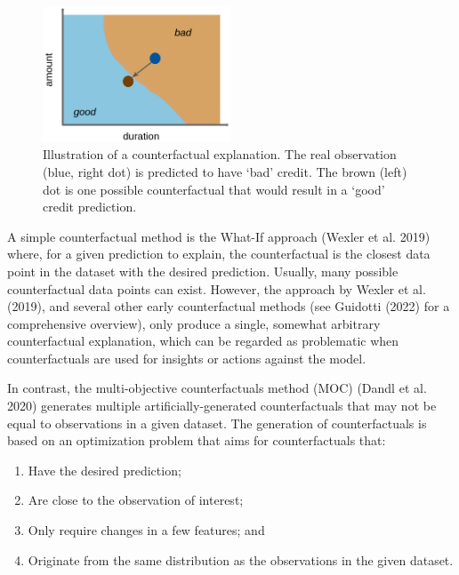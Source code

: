 \begin{figure}

{\centering \includegraphics[width=0.5\textwidth,height=\textheight]{chapters/chapter12/Figures/counterfactuals.png}

}

\caption{\label{fig-counterfactuals-ill}Illustration of a counterfactual
explanation. The real observation (blue, right dot) is predicted to have
`bad' credit. The brown (left) dot is one possible counterfactual that
would result in a `good' credit prediction.}

\end{figure}

A simple counterfactual method is the
What-If
approach (Wexler et al. 2019) where, for a given prediction to explain,
the counterfactual is the closest data point in the dataset with the
desired prediction. Usually, many possible counterfactual data points
can exist. However, the approach by Wexler et al. (2019), and several
other early counterfactual methods (see Guidotti (2022) for a
comprehensive overview), only produce a single, somewhat arbitrary
counterfactual explanation, which can be regarded as problematic when
counterfactuals are used for insights or actions against the model.

In contrast, the multi-objective
counterfactuals method (MOC) (Dandl et al. 2020)
generates multiple artificially-generated counterfactuals that may not
be equal to observations in a given dataset. The generation of
counterfactuals is based on an optimization problem that aims for
counterfactuals that:

\begin{enumerate}
\def\labelenumi{\arabic{enumi})}
\tightlist
\item
  Have the desired prediction;
\item
  Are close to the observation of interest;
\item
  Only require changes in a few features; and
\item
  Originate from the same distribution as the observations in the given
  dataset.
\end{enumerate}

